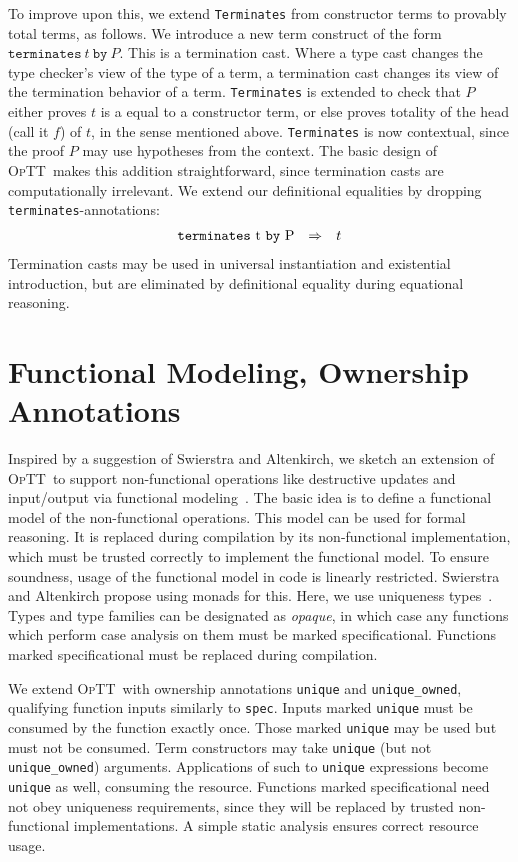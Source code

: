 \documentclass[preprint,natbib]{sigplanconf}
\newcommand{\optt}{\textsc{OpTT}}
\newcommand{\To}{\Rightarrow}
\begin{document}
To improve upon this, we extend \texttt{Terminates} from constructor
terms to provably total terms, as follows.  We introduce a new term
construct of the form $\texttt{terminates}\ t\ \texttt{by}\ P$.  This
is a termination cast.  Where a type cast changes the type checker's
view of the type of a term, a termination cast changes its view of the
termination behavior of a term.  \texttt{Terminates} is extended to
check that $P$ either proves $t$ is a equal to a constructor term, or
else proves totality of the head (call it $f$) of $t$, in the sense
mentioned above.  \texttt{Terminates} is now contextual, since the
proof $P$ may use hypotheses from the context. The basic design of
\optt\ makes this addition straightforward, since termination casts
are computationally irrelevant.  We extend our definitional equalities
by dropping \texttt{terminates}-annotations:
\[
\begin{array}{lll}
$\texttt{terminates}\ t\ \texttt{by}\ P$ & \To & t
\end{array}
\]
\noindent Termination casts may be used in universal instantiation and
existential introduction, but are eliminated by definitional equality
during equational reasoning.

\section{Functional Modeling, Ownership Annotations}
\label{sec:model}

Inspired by a suggestion of Swierstra and Altenkirch, we sketch an
extension of \optt\ to support non-functional operations like
destructive updates and input/output via functional
modeling~\cite{swierstra+07}.  The basic idea is to define a
functional model of the non-functional operations.  This model can be
used for formal reasoning.  It is replaced during compilation by its
non-functional implementation, which must be trusted correctly to
implement the functional model.  To ensure soundness, usage of the
functional model in code is linearly restricted.  Swierstra and
Altenkirch propose using monads for this.  Here, we use uniqueness
types~\cite{barendsen+93}.  Types and type families can be designated
as \emph{opaque}, in which case any functions which perform case
analysis on them must be marked specificational.  Functions marked
specificational must be replaced during compilation.

We extend \optt\ with ownership annotations \texttt{unique} and
\texttt{unique\_owned}, qualifying function inputs similarly to
\texttt{spec}.  Inputs marked \texttt{unique} must be consumed by the
function exactly once.  Those marked \texttt{unique} may be used but
must not be consumed.  Term constructors may take \texttt{unique} (but
not \texttt{unique\_owned}) arguments.  Applications of such to
\texttt{unique} expressions become \texttt{unique} as well, consuming
the resource.  Functions marked specificational need not obey
uniqueness requirements, since they will be replaced by trusted
non-functional implementations.  A simple static analysis ensures
correct resource usage.
\end{document}
